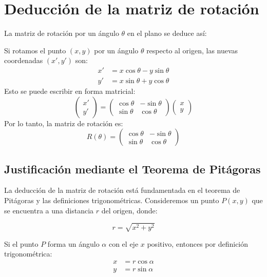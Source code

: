 \section{Deducción de la matriz de rotación}\label{sec:rotacion}
La matriz de rotación por un ángulo $\theta$ en el plano se deduce así:

Si rotamos el punto $(x, y)$ por un ángulo $\theta$ respecto al origen, las nuevas coordenadas $(x', y')$ son:
\begin{align*}
x' &= x \cos \theta - y \sin \theta \\
y' &= x \sin \theta + y \cos \theta
\end{align*}
Esto se puede escribir en forma matricial:
\begin{equation*}
\begin{pmatrix}
x' \\
y'
\end{pmatrix} =
\begin{pmatrix}
\cos \theta & -\sin \theta \\
\sin \theta & \cos \theta
\end{pmatrix}
\begin{pmatrix}
x \\
y
\end{pmatrix}
\end{equation*}
Por lo tanto, la matriz de rotación es:
\begin{equation*}
R(\theta) = \begin{pmatrix}
\cos \theta & -\sin \theta \\
\sin \theta & \cos \theta
\end{pmatrix}
\end{equation*}

\subsection{Justificación mediante el Teorema de Pitágoras}

La deducción de la matriz de rotación está fundamentada en el teorema de Pitágoras y las definiciones trigonométricas. Consideremos un punto $P(x, y)$ que se encuentra a una distancia $r$ del origen, donde:

\begin{equation*}
r = \sqrt{x^2 + y^2}
\end{equation*}

Si el punto $P$ forma un ángulo $\alpha$ con el eje $x$ positivo, entonces por definición trigonométrica:
\begin{align*}
x &= r \cos \alpha \\
y &= r \sin \alpha
\end{align*}


